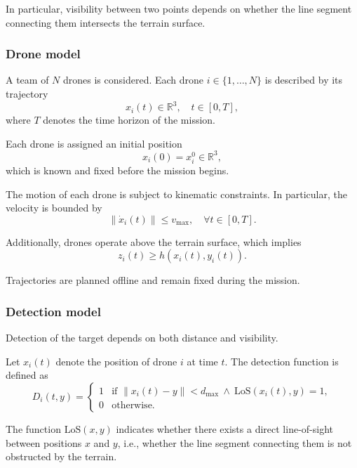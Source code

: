 \documentclass[english]{projectreport}
\begin{document}
In particular, visibility between two points depends on whether the line segment connecting them intersects the terrain surface.

\subsubsection{Drone model}

A team of $N$ drones is considered. Each drone $i \in \{1, \dots, N\}$ is described by its trajectory
\begin{equation}
x_i(t) \in \mathbb{R}^3, \quad t \in [0, T],
\end{equation}
where $T$ denotes the time horizon of the mission.

Each drone is assigned an initial position
\begin{equation}
x_i(0) = x_i^0 \in \mathbb{R}^3,
\end{equation}
which is known and fixed before the mission begins.

The motion of each drone is subject to kinematic constraints. In particular, the velocity is bounded by
\begin{equation}
\|\dot{x}_i(t)\| \leq v_{\max}, \quad \forall t \in [0, T].
\end{equation}

Additionally, drones operate above the terrain surface, which implies
\begin{equation}
z_i(t) \geq h(x_i(t), y_i(t)).
\end{equation}

Trajectories are planned offline and remain fixed during the mission.

\subsubsection{Detection model}

Detection of the target depends on both distance and visibility.

Let $x_i(t)$ denote the position of drone $i$ at time $t$. The detection function is defined as
\begin{equation}
D_i(t, y) =
\begin{cases}
1 & \text{if } \|x_i(t) - y\| < d_{\max} \ \land \ \mathrm{LoS}(x_i(t), y) = 1, \\
0 & \text{otherwise}.
\end{cases}
\end{equation}

The function $\mathrm{LoS}(x, y)$ indicates whether there exists a direct line-of-sight between positions $x$ and $y$, i.e., whether the line segment connecting them is not obstructed by the terrain.
\end{document}
